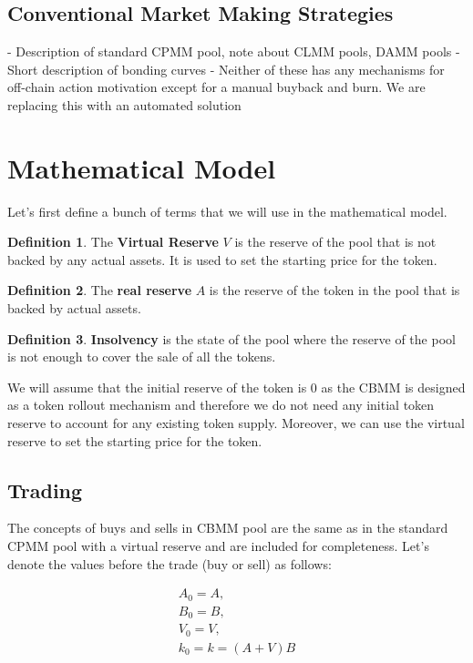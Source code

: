 \documentclass[11pt,a4paper]{article}
\theoremstyle{definition}
\newtheorem{definition}{Definition}[section]
\begin{document}
\subsection{Conventional Market Making Strategies}

- Description of standard CPMM pool, note about CLMM pools, DAMM pools
- Short description of bonding curves
- Neither of these has any mechanisms for off-chain action motivation except for a manual buyback and burn. We are replacing this with an automated solution

\section{Mathematical Model}
\label{sec:math}

Let's first define a bunch of terms that we will use in the mathematical model.

\begin{definition}
    The \textbf{Virtual Reserve} $V$ is the reserve of the pool that is not backed by any actual assets. It is used to set the starting price for the token.
\end{definition}

\begin{definition}
    The \textbf{real reserve} $A$ is the reserve of the token in the pool that is backed by actual assets.
\end{definition}

\begin{definition}
    \textbf{Insolvency} is the state of the pool where the reserve of the pool is not enough to cover the sale of all the tokens.
\end{definition}

We will assume that the initial reserve of the token is 0 as the CBMM is designed as a token rollout mechanism and therefore we do not need any initial token reserve to account for any existing token supply. Moreover, we can use the virtual reserve to set the starting price for the token.

\subsection{Trading}

The concepts of buys and sells in CBMM pool are the same as in the standard CPMM pool with a virtual reserve and are included for completeness. Let's denote the values before the trade (buy or sell) as follows:

\begin{align*}
    A_0 = A, \\
    B_0 = B, \\
    V_0 = V, \\
    k_0 = k = (A+V)B
\end{align*}
\end{document}
